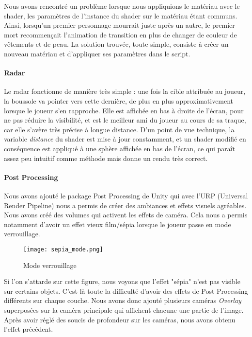         Nous avons rencontré un problème lorsque nous appliquions le matériau avec le shader,
        les paramètres de l'instance du shader sur le matériau étant communs. Ainsi, lorsqu'un premier personnage mourrait juste après un autre, 
        le premier mort recommençait l'animation de transition en plus de changer de couleur de vêtements et de peau.
        La solution trouvée, toute simple, consiste à créer un nouveau matériau et d'appliquer  ses paramètres dans le script.


        \paragraph{Radar}

        Le radar fonctionne de manière très simple : une fois la cible attribuée au joueur, la boussole va pointer vers cette dernière, de plus 
        en plus approximativement lorsque le joueur s'en rapproche. Elle est affichée en bas à droite de l'écran, pour ne pas réduire la 
        visibilité, et est le meilleur ami du joueur au cours de sa traque, car elle s'avère très précise à longue distance.
        D'un point de vue technique, la variable \textit{distance} du shader est mise à jour constamment, et un shader modifié en conséquence 
        est appliqué à une sphère affichée en bas de l'écran, ce qui paraît assez peu intuitif comme méthode mais donne un rendu très correct. 
        

        \paragraph{Post Processing}

        Nous avons ajouté le package Post Processing de Unity qui avec l'URP (Universal Render Pipeline)
        nous a permis de créer des ambiances et effets visuels agréables.
        Nous avons créé des volumes qui activent les effets de caméra.
        Cela nous a permis notamment d'avoir un effet vieux film/sépia lorsque le joueur passe en mode verrouillage.

        \begin{figure}[hbt!]
            \centering
            \texttt{[image: sepia\_mode.png]}
            \caption{Mode verrouillage}
        \end{figure}
        \FloatBarrier


        Si l'on s'attarde sur cette figure, nous voyons que l'effet "sépia" n'est pas visible sur certains objets.
        C'est là toute la difficulté d'avoir des effets de Post Processing différents sur chaque couche.
        Nous avons donc ajouté plusieurs caméras \textit{Overlay} superposées sur la caméra principale qui affichent chacune une partie de l'image.
        Après avoir réglé des soucis de profondeur sur les caméras, nous avons obtenu l'effet précédent.

